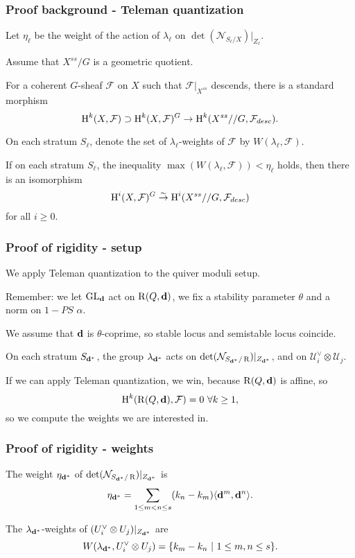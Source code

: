 \documentclass{beamer}
\begin{document}
\begin{frame}
    \frametitle{Proof background - Teleman quantization}
Let $\eta_{\ell}$ be the weight of the action of $\lambda_{\ell}$ on
$\det(\mathcal{N}_{S_{\ell}/X})|_{Z_{\ell}}$. \pause

Assume that $X^{ss}/G$ is a geometric quotient. \pause

For a coherent $G$-sheaf $\mathcal{F}$ on $X$ 
such that $\mathcal{F}|_{X^{ss}}$ descends,
there is a standard morphism
\[ \HH^k(X, \mathcal{F}) \supset \HH^{k}(X, \mathcal{F})^{G} \to \HH^{k}(X^{ss} // G, \mathcal{F}_{desc}).\] \pause
\begin{theorem}
On each stratum $S_{\ell}$,
denote the set of $\lambda_{\ell}$-weights of $\mathcal{F}$
by $W(\lambda_{\ell}, \mathcal{F})$. \pause

If on each stratum $S_{\ell}$, the inequality $\max(W(\lambda_{\ell}, \mathcal{F})) < \eta_{\ell}$
holds, then there is an isomorphism
\[\HH^{i}(X, \mathcal{F})^{G} \to[\sim] \HH^{i}(X^{ss} // G, \mathcal{F}_{desc})\]
for all $i \geq 0$.
\end{theorem}

\end{frame}

\begin{frame}
    \frametitle{Proof of rigidity - setup}
We apply Teleman quantization to the quiver moduli setup. \pause

Remember: we let $\group$ act on $\parameterspace(Q, \tuple{d})$,
we fix a stability parameter $\theta$ and a norm on $1-PS$ $\alpha$. \pause

We assume that $\tuple{d}$ is $\theta$-coprime,
so stable locus and semistable locus coincide.

On each stratum $S_{\tuple{d}^*}$, the group $\lambda_{\tuple{d}^*}$
acts on $\det(\mathcal{N}_{S_{\tuple{d}^*}/\parameterspace})|_{Z_{\tuple{d}^*}}$, \pause
and on $\mathcal{U}^{\vee}_i \otimes \mathcal{U}_j$. \pause

If we can apply Teleman quantization, we win, because $\parameterspace(Q, \tuple{d})$ is affine, so
\[\HH^k(\parameterspace(Q, \tuple{d}), \mathcal{F}) = 0 ~\forall k \geq 1,\]
so we compute the weights we are interested in.
\end{frame}

\begin{frame}
    \frametitle{Proof of rigidity - weights}
\begin{lemma}
The weight $\eta_{\tuple{d}^*}$ of $\det(\mathcal{N}_{S_{\tuple{d}^*}/\parameterspace})|_{Z_{\tuple{d}^*}}$ is
\[\eta_{\tuple{d}^*} = \sum_{1 \leq m < n \leq s} (k_n - k_m)\langle \tuple{d}^m, \tuple{d}^n \rangle.\]
\end{lemma} \pause

\begin{lemma}
    The $\lambda_{\tuple{d}^*}$-weights of $(U^{\vee}_i \otimes {U}_j)|_{Z_{\tuple{d}^*}}$ are
    \[W(\lambda_{\tuple{d}^*}, U_i^{\vee} \otimes U_j) = \{k_m - k_n ~|~ 1 \leq m, n \leq s\}.\]
\end{lemma}

\end{frame}
\end{document}
